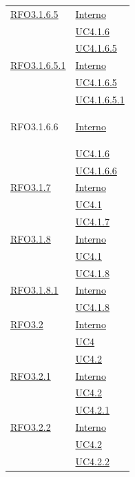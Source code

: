 \begin{itemize}
\begin{itemize}
\begin{itemize}
\begin{itemize}
\begin{longtable}{|>{\centering}m{5cm}|m{5cm}<{\centering}|}
\hyperlink{RFO3.1.6.5}{RFO3.1.6.5} & \hyperlink{Interno}{Interno}\\
& \hyperref[UC4.1.6]{UC4.1.6}\\
& \hyperref[UC4.1.6.5]{UC4.1.6.5}\\ \hline

\hyperlink{RFO3.1.6.5.1}{RFO3.1.6.5.1} & \hyperlink{Interno}{Interno}\\
& \hyperref[UC4.1.6.5]{UC4.1.6.5}\\
& \hyperref[UC4.1.6.5.1]{UC4.1.6.5.1}\\ \hline

\hypertarget{RFO3.1.6.6}{RFO3.1.6.6} & \hyperlink{Interno}{Interno}\\
& \hyperref[UC4.1.6]{UC4.1.6}\\
& \hyperref[UC4.1.6.6]{UC4.1.6.6}\\ \hline

\hyperlink{RFO3.1.7}{RFO3.1.7} & \hyperlink{Interno}{Interno}\\
& \hyperref[UC4.1]{UC4.1}\\
& \hyperref[UC4.1.7]{UC4.1.7}\\ \hline

\hyperlink{RFO3.1.8}{RFO3.1.8} & \hyperlink{Interno}{Interno}\\
& \hyperref[UC4.1]{UC4.1}\\
& \hyperref[UC4.1.8]{UC4.1.8}\\ \hline

\hyperlink{RFO3.1.8.1}{RFO3.1.8.1} & \hyperlink{Interno}{Interno}\\
& \hyperref[UC4.1.8]{UC4.1.8}\\ \hline

\hyperlink{RFO3.2}{RFO3.2} & \hyperlink{Interno}{Interno}\\
& \hyperref[UC4]{UC4}\\
& \hyperref[UC4.2]{UC4.2}\\ \hline

\hyperlink{RFO3.2.1}{RFO3.2.1} & \hyperlink{Interno}{Interno}\\
& \hyperref[UC4.2]{UC4.2}\\
& \hyperref[UC4.2.1]{UC4.2.1}\\ \hline

\hyperlink{RFO3.2.2}{RFO3.2.2} & \hyperlink{Interno}{Interno}\\
& \hyperref[UC4.2]{UC4.2}\\
& \hyperref[UC4.2.2]{UC4.2.2}\\ \hline


\end{longtable}
\end{itemize}
\end{itemize}
\end{itemize}
\end{itemize}
